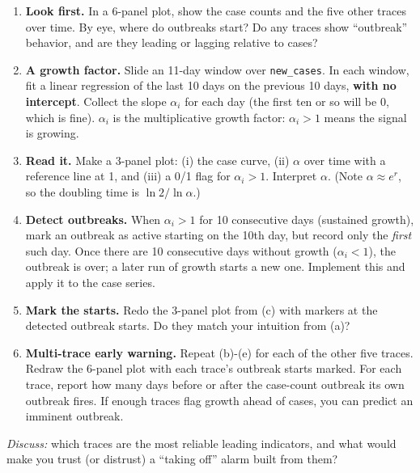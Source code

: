 \documentclass[11pt]{article}
\begin{document}
\begin{enumerate}[label=(\alph*)]
  \item \textbf{Look first.} In a 6-panel plot, show the case counts and the five other
        traces over time. By eye, where do outbreaks start? Do any traces show
        ``outbreak'' behavior, and are they leading or lagging relative to cases?

  \item \textbf{A growth factor.} Slide an 11-day window over \texttt{new\_cases}. In each
        window, fit a linear regression of the last 10 days on the previous 10 days,
        \textbf{with no intercept}. Collect the slope $\alpha_i$ for each day (the first ten
        or so will be 0, which is fine). $\alpha_i$ is the multiplicative growth factor:
        $\alpha_i > 1$ means the signal is growing.

  \item \textbf{Read it.} Make a 3-panel plot: (i) the case curve, (ii) $\alpha$ over time
        with a reference line at 1, and (iii) a 0/1 flag for $\alpha_i > 1$. Interpret
        $\alpha$. (Note $\alpha \approx e^{r}$, so the doubling time is $\ln 2 / \ln
        \alpha$.)

  \item \textbf{Detect outbreaks.} When $\alpha_i > 1$ for 10 consecutive days (sustained
        growth), mark an outbreak as active starting on the 10th day, but record only the
        \emph{first} such day. Once there are 10 consecutive days without growth ($\alpha_i
        < 1$), the outbreak is over; a later run of growth starts a new one. Implement this
        and apply it to the case series.

  \item \textbf{Mark the starts.} Redo the 3-panel plot from (c) with markers at the detected
        outbreak starts. Do they match your intuition from (a)?

  \item \textbf{Multi-trace early warning.} Repeat (b)-(e) for each of the other five traces.
        Redraw the 6-panel plot with each trace's outbreak starts marked. For each trace,
        report how many days before or after the case-count outbreak its own outbreak fires.
        If enough traces flag growth ahead of cases, you can predict an imminent outbreak.
\end{enumerate}

\vfill
\noindent\textit{Discuss:} which traces are the most reliable leading indicators, and what
would make you trust (or distrust) a ``taking off'' alarm built from them?
\end{document}
